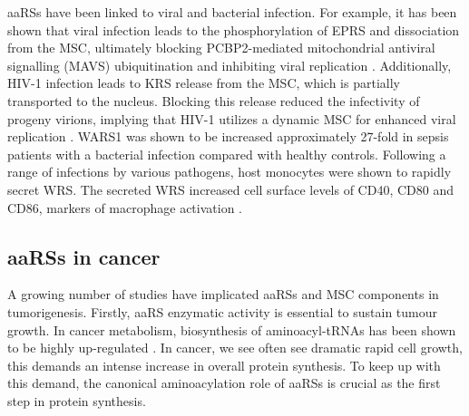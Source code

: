 aaRSs have been linked to viral and bacterial infection.
For example, it has been shown that viral infection leads to the phosphorylation of EPRS and dissociation from the MSC, ultimately blocking PCBP2-mediated mitochondrial antiviral signalling (MAVS) ubiquitination and inhibiting viral replication \cite{lee2016infection}.
Additionally, HIV-1 infection leads to KRS release from the MSC, which is partially transported to the nucleus.
Blocking this release reduced the infectivity of progeny virions, implying that HIV-1 utilizes a dynamic MSC for enhanced viral replication \cite{duchon2017hiv}.
WARS1 was shown to be increased approximately 27-fold in sepsis patients with a bacterial infection compared with healthy controls. Following a range of infections by various pathogens, host monocytes were shown to rapidly secret WRS.
The secreted WRS increased cell surface levels of CD40, CD80 and CD86, markers of macrophage activation \cite{ahn2016secreted}.

\subsection{aaRSs in cancer}
A growing number of studies have implicated aaRSs and MSC components in tumorigenesis.
Firstly, aaRS enzymatic activity is essential to sustain tumour growth. In cancer metabolism, biosynthesis of aminoacyl-tRNAs has been shown to be highly up-regulated \cite{hu2013heterogeneity}.
In cancer, we see often see dramatic rapid cell growth, this demands an intense increase in overall protein synthesis. To keep up with this demand, the canonical aminoacylation role of aaRSs is crucial as the first step in protein synthesis.

